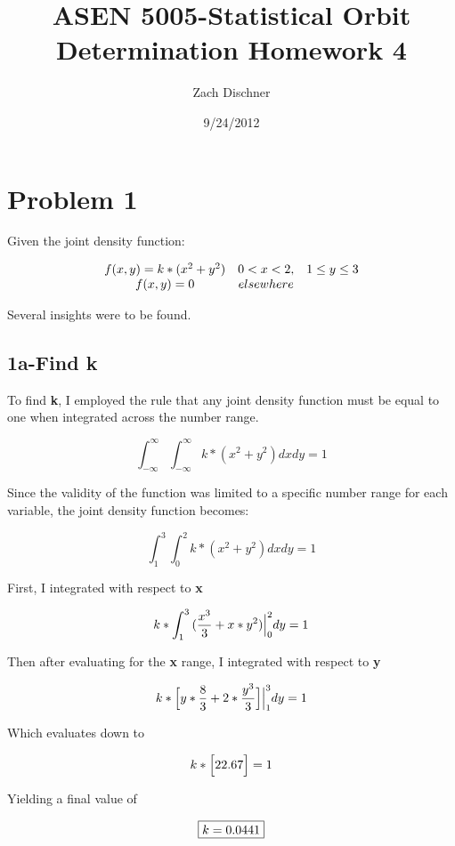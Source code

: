 \documentclass[]{article}
\begin{document}
\title{ASEN 5005-Statistical Orbit Determination
Homework 4}
\author{Zach Dischner}
\date{9/24/2012}
\maketitle

\section{Problem 1}
Given the joint density function:

\[\begin{array}[b]{ccc}
f(x,y)=k*(x^2+y^2)   &  0<x<2,&1\le y\le 3 \cr 
 f(x,y) = 0 & elsewhere & 
\end{array}\]

Several insights were to be found.



\subsection{1a-Find k} 
To find {\bf k}, I employed the rule that any joint density function must be equal to one when integrated across the number range. 


\begin{equation} 
 \int_{-\infty}^\infty{\int_{-\infty}^\infty{ k*(x^2 + y^2) } dx dy} = 1 
\end{equation}

\noindent Since the validity of the function was limited to a specific number range for each variable, the joint density function  becomes:

\begin{equation}
\int_1^3{\int_0^2{ k*(x^2 + y^2) } dx dy} = 1 
\end{equation}

\noindent First, I integrated with respect to {\bf x}

\begin{equation}
{k*\int_1^3{(\frac{x^3 }{ 3} + x*y^2) } \Big{|}_0^2 dy} = 1 
\end{equation}

\noindent Then after evaluating for the {\bf x} range, I integrated with respect to  {\bf y}

\begin{equation}
{k*\Big{ [ } y*\frac{8}{3} + 2*\frac{y^3}{3} \Big{ ] }  \Big{|}_1^3 dy} = 1 
\end{equation}

\noindent Which evaluates down to

\begin{equation}
k*\Big{ [ }  22.67 \Big{ ] } = 1 
\end{equation}

\noindent Yielding a final value of 

\begin{equation}
	\boxed {\LARGE k = 0.0441} 
\end{equation}

\
\end{document}
